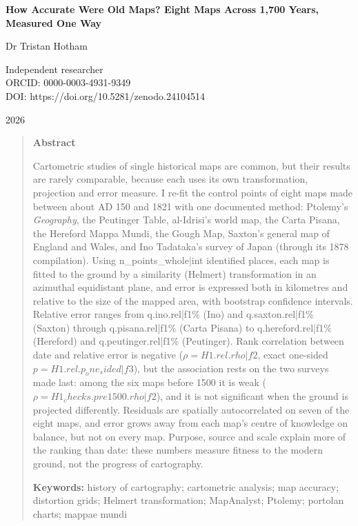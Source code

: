 \documentclass[11pt,a4paper]{article}
\begin{document}
\begin{center}
{\Large\bfseries How Accurate Were Old Maps? Eight Maps Across 1,700 Years, Measured One Way\par}
\vspace{1.2em}
{\large Dr Tristan Hotham\par}
\vspace{0.3em}
{\small Independent researcher\\
ORCID: 0000-0003-4931-9349\\
DOI: https://doi.org/10.5281/zenodo.24104514\par}
\vspace{0.8em}
2026
\end{center}

\begin{quote}
\small
\begin{center}\textbf{Abstract}\end{center}
Cartometric studies of single historical maps are common, but their results are rarely comparable, because each uses its own transformation, projection and error measure. I re-fit the control points of eight maps made between about AD 150 and 1821 with one documented method: Ptolemy's \textit{Geography}, the Peutinger Table, al-Idrisi's world map, the Carta Pisana, the Hereford Mappa Mundi, the Gough Map, Saxton's general map of England and Wales, and Ino Tadataka's survey of Japan (through its 1878 compilation). Using {{n_points_whole|int}} identified places, each map is fitted to the ground by a similarity (Helmert) transformation in an azimuthal equidistant plane, and error is expressed both in kilometres and relative to the size of the mapped area, with bootstrap confidence intervals. Relative error ranges from {{q.ino.rel|f1}}\% (Ino) and {{q.saxton.rel|f1}}\% (Saxton) through {{q.pisana.rel|f1}}\% (Carta Pisana) to {{q.hereford.rel|f1}}\% (Hereford) and {{q.peutinger.rel|f1}}\% (Peutinger). Rank correlation between date and relative error is negative ($\rho = {{H1.rel.rho|f2}}$, exact one-sided $p = {{H1.rel.p_one_sided|f3}}$), but the association rests on the two surveys made last: among the six maps before 1500 it is weak ($\rho = {{H1_checks.pre1500.rho|f2}}$), and it is not significant when the ground is projected differently. Residuals are spatially autocorrelated on seven of the eight maps, and error grows away from each map's centre of knowledge on balance, but not on every map. Purpose, source and scale explain more of the ranking than date: these numbers measure fitness to the modern ground, not the progress of cartography.

\textbf{Keywords:} history of cartography; cartometric analysis; map accuracy; distortion grids; Helmert transformation; MapAnalyst; Ptolemy; portolan charts; mappae mundi
\end{quote}
\end{document}
